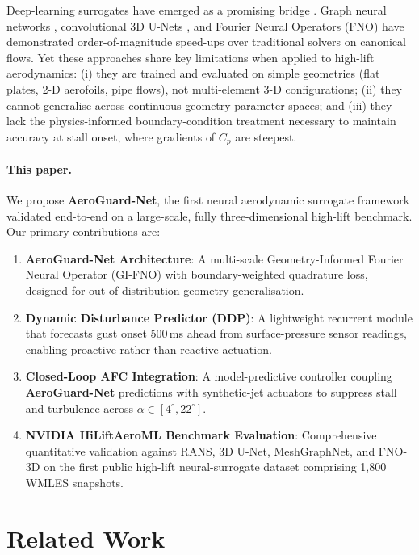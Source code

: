 \documentclass[10pt,twocolumn,letterpaper]{article}
\newcommand{\aeroguard}{\textbf{AeroGuard-Net}}
\newcommand{\Cp}{C_p}
\begin{document}
Deep-learning surrogates have emerged as a promising bridge
\cite{Brunton2020ML4Fluids}. Graph neural networks
\cite{Pfaff2021MeshGraphNets,Belbute-Peres2020Combining},
convolutional 3D U-Nets \cite{Thuerey2020Deep3DFlow}, and Fourier
Neural Operators (FNO) \cite{Li2021FNO,Wen2022U-FNO} have
demonstrated order-of-magnitude speed-ups over traditional solvers on
canonical flows. Yet these approaches share key limitations when
applied to high-lift aerodynamics: (i) they are trained and evaluated
on simple geometries (flat plates, 2-D aerofoils, pipe flows), not
multi-element 3-D configurations; (ii) they cannot generalise across
continuous geometry parameter spaces; and (iii) they lack the
physics-informed boundary-condition treatment necessary to maintain
accuracy at stall onset, where gradients of $\Cp$ are steepest.

\paragraph{This paper.}
We propose \aeroguard{}, the first neural aerodynamic surrogate
framework validated end-to-end on a large-scale, fully three-dimensional
high-lift benchmark. Our primary contributions are:
\begin{enumerate}
  \item \textbf{AeroGuard-Net Architecture}: A multi-scale
        Geometry-Informed Fourier Neural Operator (GI-FNO) with
        boundary-weighted quadrature loss, designed for
        out-of-distribution geometry generalisation.
  \item \textbf{Dynamic Disturbance Predictor (DDP)}: A lightweight
        recurrent module that forecasts gust onset 500\,ms ahead from
        surface-pressure sensor readings, enabling proactive rather
        than reactive actuation.
  \item \textbf{Closed-Loop AFC Integration}: A model-predictive
        controller coupling \aeroguard{} predictions with synthetic-jet
        actuators to suppress stall and turbulence across
        $\alpha \in [4^\circ, 22^\circ]$.
  \item \textbf{NVIDIA HiLiftAeroML Benchmark Evaluation}: Comprehensive
        quantitative validation against RANS, 3D U-Net, MeshGraphNet,
        and FNO-3D on the first public high-lift neural-surrogate
        dataset comprising 1,800 WMLES snapshots.
\end{enumerate}

\section{Related Work}
\label{sec:related_work}
\end{document}
